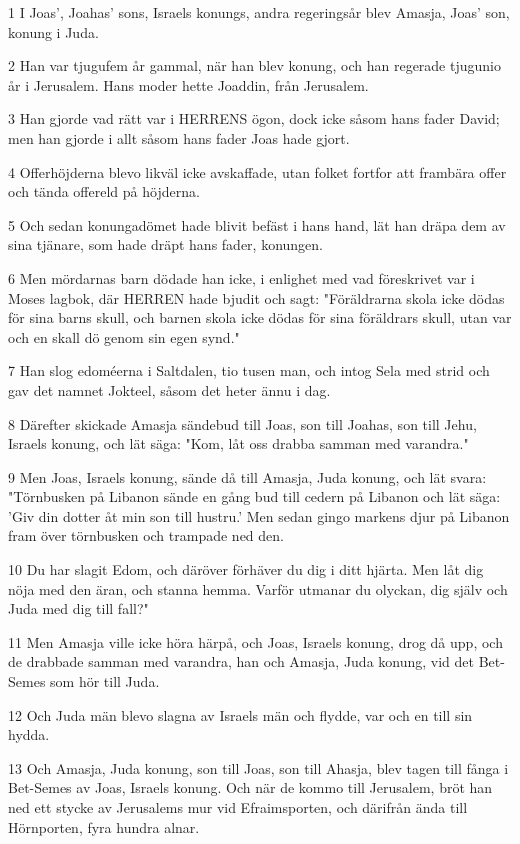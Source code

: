 \par 1 I Joas', Joahas' sons, Israels konungs, andra regeringsår blev Amasja, Joas' son, konung i Juda.
\par 2 Han var tjugufem år gammal, när han blev konung, och han regerade tjugunio år i Jerusalem. Hans moder hette Joaddin, från Jerusalem.
\par 3 Han gjorde vad rätt var i HERRENS ögon, dock icke såsom hans fader David; men han gjorde i allt såsom hans fader Joas hade gjort.
\par 4 Offerhöjderna blevo likväl icke avskaffade, utan folket fortfor att frambära offer och tända offereld på höjderna.
\par 5 Och sedan konungadömet hade blivit befäst i hans hand, lät han dräpa dem av sina tjänare, som hade dräpt hans fader, konungen.
\par 6 Men mördarnas barn dödade han icke, i enlighet med vad föreskrivet var i Moses lagbok, där HERREN hade bjudit och sagt: "Föräldrarna skola icke dödas för sina barns skull, och barnen skola icke dödas för sina föräldrars skull, utan var och en skall dö genom sin egen synd."
\par 7 Han slog edoméerna i Saltdalen, tio tusen man, och intog Sela med strid och gav det namnet Jokteel, såsom det heter ännu i dag.
\par 8 Därefter skickade Amasja sändebud till Joas, son till Joahas, son till Jehu, Israels konung, och lät säga: "Kom, låt oss drabba samman med varandra."
\par 9 Men Joas, Israels konung, sände då till Amasja, Juda konung, och lät svara: "Törnbusken på Libanon sände en gång bud till cedern på Libanon och lät säga: 'Giv din dotter åt min son till hustru.' Men sedan gingo markens djur på Libanon fram över törnbusken och trampade ned den.
\par 10 Du har slagit Edom, och däröver förhäver du dig i ditt hjärta. Men låt dig nöja med den äran, och stanna hemma. Varför utmanar du olyckan, dig själv och Juda med dig till fall?"
\par 11 Men Amasja ville icke höra härpå, och Joas, Israels konung, drog då upp, och de drabbade samman med varandra, han och Amasja, Juda konung, vid det Bet-Semes som hör till Juda.
\par 12 Och Juda män blevo slagna av Israels män och flydde, var och en till sin hydda.
\par 13 Och Amasja, Juda konung, son till Joas, son till Ahasja, blev tagen till fånga i Bet-Semes av Joas, Israels konung. Och när de kommo till Jerusalem, bröt han ned ett stycke av Jerusalems mur vid Efraimsporten, och därifrån ända till Hörnporten, fyra hundra alnar.
